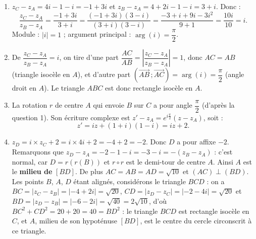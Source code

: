 \documentclass[11pt]{article}
\newcommand{\cle}[1]{{\popxbold\color{popdark}#1}}
\begin{document}
\begin{corrige}
\begin{enumerate}
\item $z_C - z_A = 4i - 1 - i = -1 + 3i$ et $z_B - z_A = 4 + 2i - 1 - i = 3 + i$. Donc :
\[ \frac{z_C - z_A}{z_B - z_A} = \frac{-1 + 3i}{3 + i} = \frac{(-1+3i)(3-i)}{(3+i)(3-i)} = \frac{-3 + i + 9i - 3i^2}{9 + 1} = \frac{10i}{10} = i. \]
Module : $|i| = 1$ ; argument principal : $\arg(i) = \dfrac{\pi}{2}$.
\item De $\dfrac{z_C - z_A}{z_B - z_A} = i$, on tire d'une part $\dfrac{AC}{AB} = \left|\dfrac{z_C - z_A}{z_B - z_A}\right| = 1$, donc $AC = AB$ (triangle isocèle en $A$), et d'autre part $\left(\overrightarrow{AB}\,;\overrightarrow{AC}\right) = \arg(i) = \dfrac{\pi}{2}$ (angle droit en $A$). Le triangle $ABC$ est donc \cle{rectangle isocèle en $A$}.
\item La rotation $r$ de centre $A$ qui envoie $B$ sur $C$ a pour angle $\dfrac{\pi}{2}$ (d'après la question 1). Son écriture complexe est $z' - z_A = e^{i\frac{\pi}{2}}(z - z_A)$, soit :
\[ z' = iz + (1+i)(1 - i) = iz + 2. \]
\item $z_D = i \times z_C + 2 = i \times 4i + 2 = -4 + 2 = -2$. Donc $D$ a pour affixe $-2$.
Remarquons que $z_D - z_A = -2 - 1 - i = -3 - i = -(z_B - z_A)$ : c'est normal, car $D = r(r(B))$ et $r \circ r$ est le demi-tour de centre $A$. Ainsi $A$ est le \textbf{milieu de} $[BD]$. De plus $AC = AB = AD = \sqrt{10}$ et $(AC) \perp (BD)$. Les points $B$, $A$, $D$ étant alignés, considérons le triangle $BCD$ : on a $BC = \left|z_C - z_B\right| = |-4 + 2i| = \sqrt{20}$, $CD = \left|z_D - z_C\right| = |-2 - 4i| = \sqrt{20}$ et $BD = \left|z_D - z_B\right| = |-6 - 2i| = \sqrt{40} = 2\sqrt{10}$, d'où $BC^2 + CD^2 = 20 + 20 = 40 = BD^2$ : le triangle $BCD$ est \cle{rectangle isocèle en $C$}, et $A$, milieu de son hypoténuse $[BD]$, est le centre du cercle circonscrit à ce triangle.
\end{enumerate}
\end{corrige}
\end{document}
